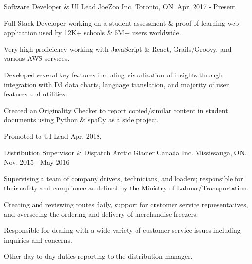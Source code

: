 

\begin{cventries}

  \cventry
    {Software Developer \& UI Lead} %
    {JoeZoo Inc.} %
    {Toronto, ON.} %
    {Apr. 2017 - Present} %
    {
      \begin{cvitems} %
        \item {Full Stack Developer working on a student assessment \& proof-of-learning web application used by 12K+ schools \& 5M+ users worldwide.}
        \item {Very high proficiency working with JavaScript \& React, Grails/Groovy, and various AWS services.}
        \item {Developed several key features including visualization of insights through integration with D3 data charts, language translation, and majority of user features and utilities.}
        \item {Created an Originality Checker to report copied/similar content in student documents using Python \& spaCy as a side project.}
        \item {Promoted to UI Lead Apr. 2018.}
      \end{cvitems}
    }

  \cventry
    {Distribution Supervisor \& Dispatch} %
    {Arctic Glacier Canada Inc.} %
    {Mississauga, ON.} %
    {Nov. 2015 - May 2016} %
    {
      \begin{cvitems} %
        \item {Supervising a team of company drivers, technicians, and loaders; responsible for their safety and compliance as defined by the Ministry of Labour/Transportation.}
        \item {Creating and reviewing routes daily, support for customer service representatives, and overseeing the ordering and delivery of merchandise freezers.}
        \item {Responsible for dealing with a wide variety of customer service issues including inquiries and concerns.}
        \item {Other day to day duties reporting to the distribution manager.}
      \end{cvitems}
    }


\end{cventries}
